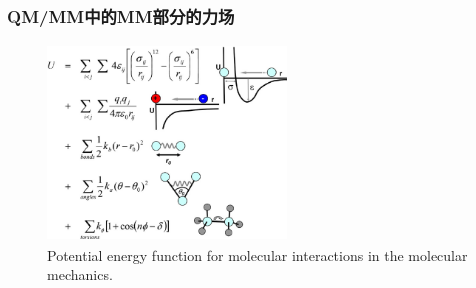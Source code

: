 \frame
{
	\frametitle{\textrm{QM/MM}中的\textrm{MM}部分的力场}
{\fontsize{6.0pt}{4.2pt}}
\begin{figure}[h!]
\centering
\vspace*{-0.05in}
\includegraphics[height=2.05in,width=2.50in,viewport=0 0 650 524,clip]{Figures/Potential-energy-function-for-molecular-interactions-in-the-molecular-mechanics.png}
\caption{\tiny \textrm{Potential energy function for molecular interactions in the molecular mechanics.}}%
\label{Potential-molecules}
\end{figure}
}


